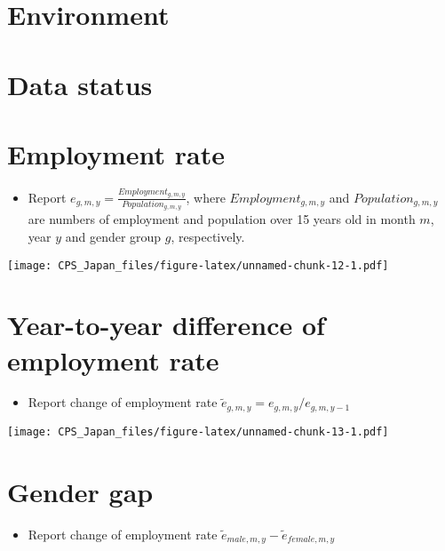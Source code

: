 \documentclass[
]{book}
\providecommand{\tightlist}{%
  \setlength{\itemsep}{0pt}\setlength{\parskip}{0pt}}
\begin{document}
\hypertarget{environment-2}{%
\section{Environment}\label{environment-2}}

\hypertarget{data-status}{%
\section{Data status}\label{data-status}}

\hypertarget{employment-rate-2}{%
\section{Employment rate}\label{employment-rate-2}}

\begin{itemize}
\tightlist
\item
  Report \(e_{g,m,y} = \frac{Employment_{g,m,y}}{Population_{g,m,y}}\), where \(Employment_{g,m,y}\) and \(Population_{g,m,y}\) are numbers of employment and population over 15 years old in month \(m\), year \(y\) and gender group \(g\), respectively.
\end{itemize}

\texttt{[image: CPS\_Japan\_files/figure-latex/unnamed-chunk-12-1.pdf]}

\hypertarget{year-to-year-difference-of-employment-rate-2}{%
\section{Year-to-year difference of employment rate}\label{year-to-year-difference-of-employment-rate-2}}

\begin{itemize}
\tightlist
\item
  Report change of employment rate \(\tilde e_{g,m,y}=e_{g,m,y}/e_{g,m,y-1}\)
\end{itemize}

\texttt{[image: CPS\_Japan\_files/figure-latex/unnamed-chunk-13-1.pdf]}

\hypertarget{gender-gap-2}{%
\section{Gender gap}\label{gender-gap-2}}

\begin{itemize}
\tightlist
\item
  Report change of employment rate \(\tilde e_{male,m,y}-\tilde e_{female,m,y}\)
\end{itemize}
\end{document}
